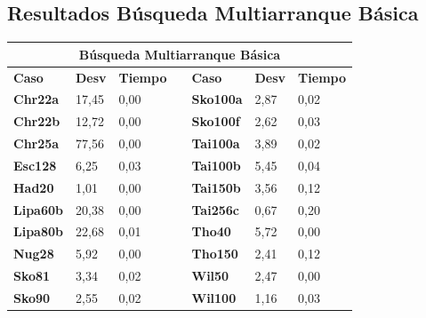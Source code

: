 \documentclass[a4paper, 12pt]{article}
\begin{document}
      \subsection{Resultados Búsqueda Multiarranque Básica}
      \begin{table}[H]
      \centering
\begin{tabular}{|l|l|l|l|l|l|l|}
\hline
\multicolumn{7}{|c|}{\textbf{Búsqueda Multiarranque Básica}}                                                        \\ \hline
\textbf{Caso}    & \textbf{Desv} & \textbf{Tiempo} & \textbf{} & \textbf{Caso}    & \textbf{Desv} & \textbf{Tiempo} \\ \cline{1-3} \cline{5-7} 
\textbf{Chr22a}  & 17,45         & 0,00            &           & \textbf{Sko100a} & 2,87          & 0,02            \\ \cline{1-3} \cline{5-7} 
\textbf{Chr22b}  & 12,72         & 0,00            &           & \textbf{Sko100f} & 2,62          & 0,03            \\ \cline{1-3} \cline{5-7} 
\textbf{Chr25a}  & 77,56         & 0,00            &           & \textbf{Tai100a} & 3,89          & 0,02            \\ \cline{1-3} \cline{5-7} 
\textbf{Esc128}  & 6,25          & 0,03            &           & \textbf{Tai100b} & 5,45          & 0,04            \\ \cline{1-3} \cline{5-7} 
\textbf{Had20}   & 1,01          & 0,00            &           & \textbf{Tai150b} & 3,56          & 0,12            \\ \cline{1-3} \cline{5-7} 
\textbf{Lipa60b} & 20,38         & 0,00            &           & \textbf{Tai256c} & 0,67          & 0,20            \\ \cline{1-3} \cline{5-7} 
\textbf{Lipa80b} & 22,68         & 0,01            &           & \textbf{Tho40}   & 5,72          & 0,00            \\ \cline{1-3} \cline{5-7} 
\textbf{Nug28}   & 5,92          & 0,00            &           & \textbf{Tho150}  & 2,41          & 0,12            \\ \cline{1-3} \cline{5-7} 
\textbf{Sko81}   & 3,34          & 0,02            &           & \textbf{Wil50}   & 2,47          & 0,00            \\ \cline{1-3} \cline{5-7} 
\textbf{Sko90}   & 2,55          & 0,02            &           & \textbf{Wil100}  & 1,16          & 0,03            \\ \cline{1-3} \cline{5-7} 
\end{tabular}
\end{table}
\end{document}
